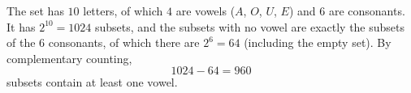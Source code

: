 The set has $10$ letters, of which $4$ are vowels ($A$, $O$, $U$, $E$) and $6$ are consonants. It has $2^{10}=1024$ subsets, and the subsets with no vowel are exactly the subsets of the $6$ consonants, of which there are $2^6=64$ (including the empty set). By complementary counting,
\[
1024-64=\boxed{960}
\]
subsets contain at least one vowel.
